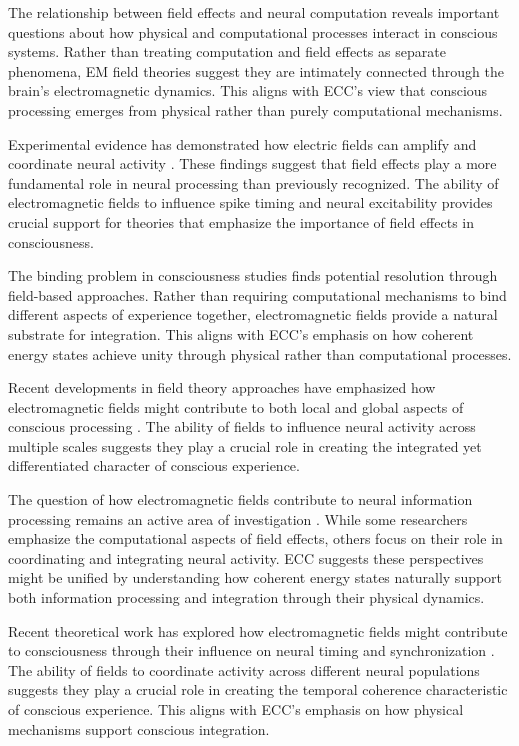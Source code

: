 \begin{refsection}
The relationship between field effects and neural computation \cite{Weiss2010} reveals important questions about how physical and computational processes interact in conscious systems. Rather than treating computation and field effects as separate phenomena, EM field theories suggest they are intimately connected through the brain's electromagnetic dynamics. This aligns with ECC's view that conscious processing emerges from physical rather than purely computational mechanisms.

Experimental evidence has demonstrated how electric fields can amplify and coordinate neural activity \cite{Radman2007}. These findings suggest that field effects play a more fundamental role in neural processing than previously recognized. The ability of electromagnetic fields to influence spike timing and neural excitability provides crucial support for theories that emphasize the importance of field effects in consciousness.

The binding problem in consciousness studies \cite{Singer2001} finds potential resolution through field-based approaches. Rather than requiring computational mechanisms to bind different aspects of experience together, electromagnetic fields provide a natural substrate for integration. This aligns with ECC's emphasis on how coherent energy states achieve unity through physical rather than computational processes.

Recent developments in field theory approaches have emphasized how electromagnetic fields might contribute to both local and global aspects of conscious processing \cite{John2001}. The ability of fields to influence neural activity across multiple scales suggests they play a crucial role in creating the integrated yet differentiated character of conscious experience.

The question of how electromagnetic fields contribute to neural information processing remains an active area of investigation \cite{Barrett2011}. While some researchers emphasize the computational aspects of field effects, others focus on their role in coordinating and integrating neural activity. ECC suggests these perspectives might be unified by understanding how coherent energy states naturally support both information processing and integration through their physical dynamics.

Recent theoretical work has explored how electromagnetic fields might contribute to consciousness through their influence on neural timing and synchronization \cite{Pockett2012}. The ability of fields to coordinate activity across different neural populations suggests they play a crucial role in creating the temporal coherence characteristic of conscious experience. This aligns with ECC's emphasis on how physical mechanisms support conscious integration.


\end{refsection}
